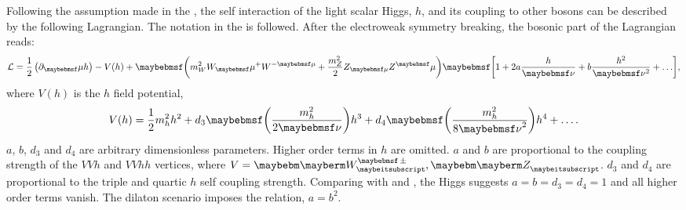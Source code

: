 Following the assumption made in the \cite{Contino:2010mh,Contino:2013gna}, the self interaction of the light scalar Higgs, $h$, and its coupling to other \SM bosons can be described by the following Lagrangian. The notation in the \cite{Contino:2013gna} is followed. After the electroweak symmetry breaking, the bosonic part of the Lagrangian reads:
\begin{equation}
\Lagr =\frac{1}{2}\left(\partial_\mu{h}\right)  - V(h) + \parenths{m_W^2{W}_\mu^+{W}^{-\mu} + \frac{m_Z^2}{2}Z_{\mu}Z^\mu}\sqbracs{1 + 2a\frac{h}{\nu} + b \frac{h^2}{\nu^2} + \hdots},
\end{equation}
where $V(h)$ is the $h$ field potential,
\begin{equation}
V(h) = \frac{1}{2}m_h^2h^2 + d_3\parenths{\frac{m_h^2}{2\nu}}h^3 + d_4\parenths{\frac{m_h^2}{8{\nu}^2}}h^4 + \hdots .
\end{equation}
$a$, $b$, $d_3$ and $d_4$ are arbitrary dimensionless parameters. Higher order terms in $h$ are omitted. $a$ and $b$ are proportional to the coupling strength of the $VVh$ and $VVhh$ vertices, where $V = \PWpm, \PZ$. $d_3$ and $d_4$ are proportional to the triple and quartic $h$ self coupling strength. Comparing with  and , the \SM Higgs suggests $a=b=d_3=d_4=1$ and all higher order terms vanish. The dilaton scenario imposes the relation, $a = b^2$.

